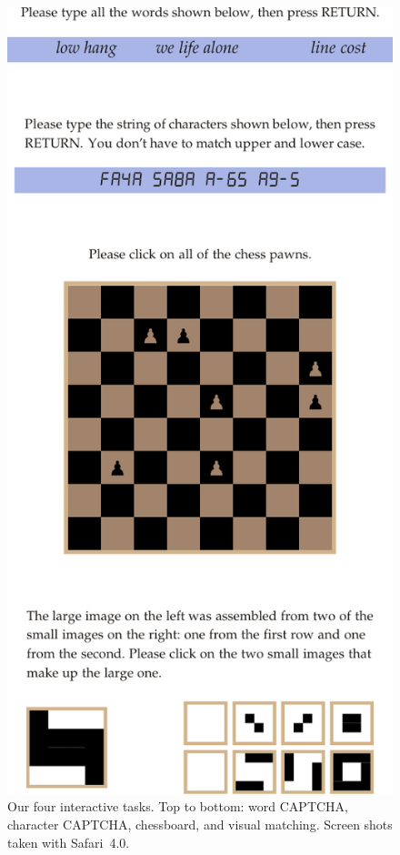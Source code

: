 \documentclass[conference]{IEEEtran}
\begin{document}
\begin{figure}[p]
\centerline{\includegraphics{tasks}}
\caption{Our four interactive tasks.  Top to bottom: word CAPTCHA,
  character CAPTCHA, chessboard, and visual matching.  Screen shots
  taken with Safari~4.0.}\label{fig:tasks}
\end{figure}
\end{document}
